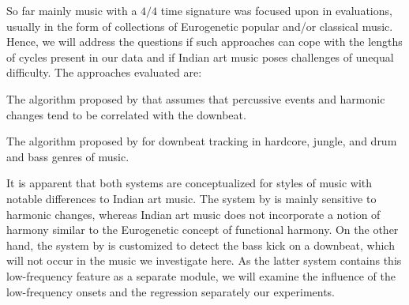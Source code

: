 So far mainly music with a $4/4$ time signature was focused upon in evaluations, usually in the form of collections of Eurogenetic popular and/or classical music. Hence, we will address the questions if such approaches can cope with the lengths of cycles present in our data and if Indian art music poses challenges of unequal difficulty. The approaches evaluated are: 
\begin{description}[leftmargin=*]
\item[\acrshort{DAV} algorithm:]The algorithm proposed by  that assumes that percussive events and harmonic changes tend to be correlated with the downbeat.
\item[\acrshort{HOC} algorithm:]The algorithm proposed by  for downbeat tracking in hardcore, jungle, and drum and bass genres of music.
\end{description}
It is apparent that both systems are conceptualized for styles of music with notable differences to Indian art music. The system by  is mainly sensitive to harmonic changes, whereas Indian art music does not incorporate a notion of harmony similar to the Eurogenetic concept of functional harmony. On the other hand, the system by  is customized to detect the bass kick on a downbeat, which will not occur in the music we investigate here. As the latter system contains this low-frequency feature as a separate module, we will examine the influence of the low-frequency onsets and the regression separately our experiments.

